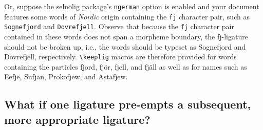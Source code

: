\documentclass[12pt]{article}
\newcommand{\pkg}[1]{\textsf{#1}}
\newcommand{\opt}[1]{\texttt{#1}}
\newcommand{\cmmd}[1]{\texttt{\textbackslash #1}}
\begin{document}
Or, suppose the \pkg{selnolig} package's \opt{ngerman} option is enabled and your document features some words of \emph{Nordic} origin containing the \opt{fj} character pair, such as \opt{Sognefjord} and \opt{Dovrefjell}. Observe that because the \opt{fj} character pair contained in these words does not span a morpheme boundary, the \mbox{fj}-ligature should not be broken up, i.e., the words should be typeset as Sognefjord and Dovrefjell, respectively.  \cmmd{keeplig} macros are therefore provided for words containing the particles fjord, fjör, fjell, and fjäll as well as for names such as Eefje, Sufjan, Prokofjew, and Astafjew.



\subsection{What if one ligature pre-empts a subsequent, more appropriate ligature?} \label{sec:preempt}
\end{document}
